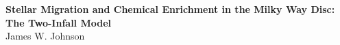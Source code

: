 \documentclass[12pt]{report}
\newcommand{\biblio}{
	
	
}
\begin{document}
 
\renewcommand{\biblio}{} 

\begin{center} 
\textbf{{\Large Stellar Migration and Chemical Enrichment in the Milky Way Disc: 
The Two-Infall Model}} 
\\ 
James W. Johnson 
\end{center} 

 

 
 
\end{document}

